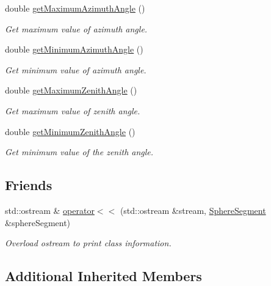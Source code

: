 \begin{DoxyCompactItemize}
double \hyperlink{classtudat_1_1geometric__shapes_1_1SphereSegment_aec76a90c3eca3ce066aa75a24923d55c}{get\+Maximum\+Azimuth\+Angle} ()
\begin{DoxyCompactList}\small\item\em Get maximum value of azimuth angle. \end{DoxyCompactList}\item 
double \hyperlink{classtudat_1_1geometric__shapes_1_1SphereSegment_a1b6e236b804c39e1270778c849f6800b}{get\+Minimum\+Azimuth\+Angle} ()
\begin{DoxyCompactList}\small\item\em Get minimum value of azimuth angle. \end{DoxyCompactList}\item 
double \hyperlink{classtudat_1_1geometric__shapes_1_1SphereSegment_a0d0fbf7a541b21467118b2fa4946a0c8}{get\+Maximum\+Zenith\+Angle} ()
\begin{DoxyCompactList}\small\item\em Get maximum value of zenith angle. \end{DoxyCompactList}\item 
double \hyperlink{classtudat_1_1geometric__shapes_1_1SphereSegment_a4de01c2d6a53908f337ef2641d712ce4}{get\+Minimum\+Zenith\+Angle} ()
\begin{DoxyCompactList}\small\item\em Get minimum value of the zenith angle. \end{DoxyCompactList}\end{DoxyCompactItemize}
\subsection*{Friends}
\begin{DoxyCompactItemize}
\item 
std\+::ostream \& \hyperlink{classtudat_1_1geometric__shapes_1_1SphereSegment_a959b3ec6633731b8397f43be206b20f1}{operator$<$$<$} (std\+::ostream \&stream, \hyperlink{classtudat_1_1geometric__shapes_1_1SphereSegment}{Sphere\+Segment} \&sphere\+Segment)
\begin{DoxyCompactList}\small\item\em Overload ostream to print class information. \end{DoxyCompactList}\end{DoxyCompactItemize}
\subsection*{Additional Inherited Members}


